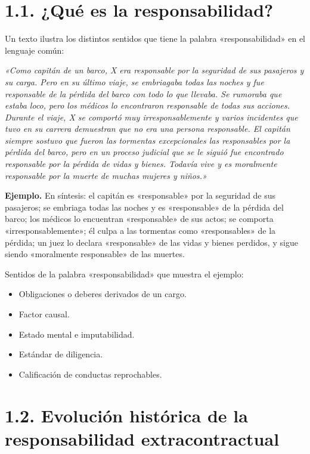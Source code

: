 
\section{1.1. ¿Qué es la responsabilidad?}
Un texto ilustra los distintos sentidos que tiene la palabra «responsabilidad» en el lenguaje común:

\begin{cita}
\textit{«Como capitán de un barco, X era responsable por la seguridad de sus pasajeros y su carga. Pero en su último viaje, se embriagaba todas las noches y fue responsable de la pérdida del barco con todo lo que llevaba. Se rumoraba que estaba loco, pero los médicos lo encontraron responsable de todas sus acciones. Durante el viaje, X se comportó muy irresponsablemente y varios incidentes que tuvo en su carrera demuestran que no era una persona responsable. El capitán siempre sostuvo que fueron las tormentas excepcionales las responsables por la pérdida del barco, pero en un proceso judicial que se le siguió fue encontrado responsable por la pérdida de vidas y bienes. Todavía vive y es moralmente responsable por la muerte de muchas mujeres y niños.»}
\end{cita}
\begin{ejemplo}
\textcolor[HTML]{4F6228}{\textbf{Ejemplo. }}En síntesis: el capitán es «responsable» por la seguridad de sus pasajeros; se embriaga todas las noches y es «responsable» de la pérdida del barco; los médicos lo encuentran «responsable» de sus actos; se comporta «irresponsablemente»; él culpa a las tormentas como «responsables» de la pérdida; un juez lo declara «responsable» de las vidas y bienes perdidos, y sigue siendo «moralmente responsable» de las muertes.
\end{ejemplo}
Sentidos de la palabra «responsabilidad» que muestra el ejemplo:

\begin{itemize}
\item Obligaciones o deberes derivados de un cargo.
\item Factor causal.
\item Estado mental e imputabilidad.
\item Estándar de diligencia.
\item Calificación de conductas reprochables.
\end{itemize}
\section{1.2. Evolución histórica de la responsabilidad extracontractual}
